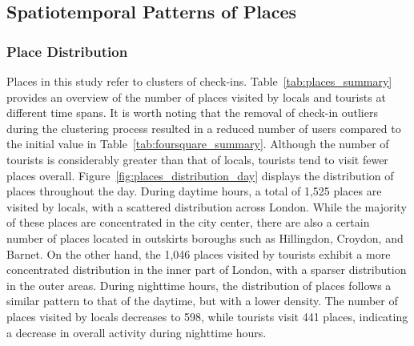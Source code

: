 \documentclass{article}
\theoremstyle{definition}
\theoremstyle{remark}
\begin{document}
\subsection{Spatiotemporal Patterns of Places}

\subsubsection{Place Distribution}
Places in this study refer to clusters of check-ins. Table~\ref{tab:places_summary} provides an overview of the number of places visited by locals and tourists at different time spans. It is worth noting that the removal of check-in outliers during the clustering process resulted in a reduced number of users compared to the initial value in Table~\ref{tab:foursquare_summary}. Although the number of tourists is considerably greater than that of locals, tourists tend to visit fewer places overall. Figure~\ref{fig:places_distribution_day} displays the distribution of places throughout the day. During daytime hours, a total of 1,525 places are visited by locals, with a scattered distribution across London. While the majority of these places are concentrated in the city center, there are also a certain number of places located in outskirts boroughs such as Hillingdon, Croydon, and Barnet. On the other hand, the 1,046 places visited by tourists exhibit a more concentrated distribution in the inner part of London, with a sparser distribution in the outer areas. During nighttime hours, the distribution of places follows a similar pattern to that of the daytime, but with a lower density. The number of places visited by locals decreases to 598, while tourists visit 441 places, indicating a decrease in overall activity during nighttime hours.
\end{document}
